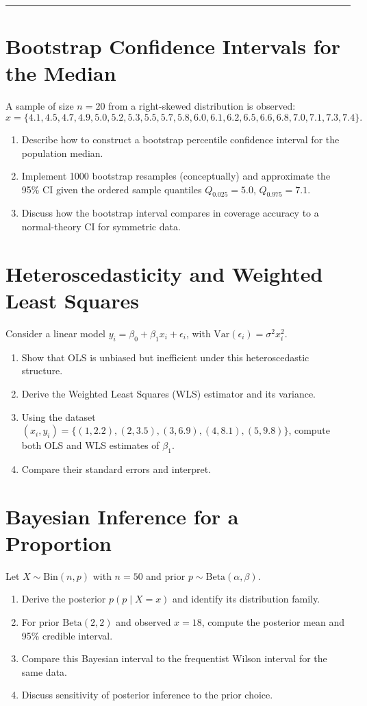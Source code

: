 \documentclass[12pt,a4paper]{article}
\begin{document}
\bigskip
\hrule
\bigskip

\noindent


\section{Bootstrap Confidence Intervals for the Median}
A sample of size \( n=20 \) from a right-skewed distribution is observed:
\[
x = \{4.1, 4.5, 4.7, 4.9, 5.0, 5.2, 5.3, 5.5, 5.7, 5.8, 6.0, 6.1, 6.2, 6.5, 6.6, 6.8, 7.0, 7.1, 7.3, 7.4\}.
\]
\begin{enumerate}[label=(\arabic*)]
\item Describe how to construct a bootstrap percentile confidence interval for the population median.
\item Implement 1000 bootstrap resamples (conceptually) and approximate the 95\% CI given the ordered sample quantiles \( Q_{0.025}=5.0 \), \( Q_{0.975}=7.1 \).
\item Discuss how the bootstrap interval compares in coverage accuracy to a normal-theory CI for symmetric data.
\end{enumerate}

\section{Heteroscedasticity and Weighted Least Squares}
Consider a linear model \( y_i = \beta_0 + \beta_1 x_i + \epsilon_i \), with \( \mathrm{Var}(\epsilon_i) = \sigma^2 x_i^2 \).
\begin{enumerate}[label=(\arabic*)]
\item Show that OLS is unbiased but inefficient under this heteroscedastic structure.
\item Derive the Weighted Least Squares (WLS) estimator and its variance.
\item Using the dataset \( (x_i,y_i) = \{(1,2.2),(2,3.5),(3,6.9),(4,8.1),(5,9.8)\} \), compute both OLS and WLS estimates of \( \beta_1 \).
\item Compare their standard errors and interpret.
\end{enumerate}

\section{Bayesian Inference for a Proportion}
Let \( X \sim \mathrm{Bin}(n,p) \) with \( n=50 \) and prior \( p \sim \mathrm{Beta}(\alpha,\beta) \).
\begin{enumerate}[label=(\arabic*)]
\item Derive the posterior \( p(p\mid X=x) \) and identify its distribution family.
\item For prior \( \mathrm{Beta}(2,2) \) and observed \( x=18 \), compute the posterior mean and 95\% credible interval.
\item Compare this Bayesian interval to the frequentist Wilson interval for the same data.
\item Discuss sensitivity of posterior inference to the prior choice.
\end{enumerate}
\end{document}
